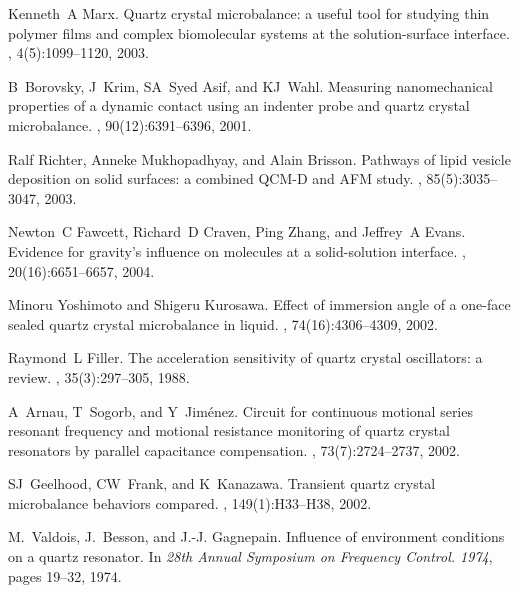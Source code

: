 \documentclass[floatfix,superscriptaddress,a4paper,twocolumn]{revtex4-1}
\begin{document}
\begin{thebibliography}{10}
  Kenneth~A Marx.
  \newblock Quartz crystal microbalance: a useful tool for studying thin polymer
  films and complex biomolecular systems at the solution-surface interface.
  , 4(5):1099--1120, 2003.

  B~Borovsky, J~Krim, SA~{Syed Asif}, and KJ~Wahl.
  \newblock Measuring nanomechanical properties of a dynamic contact using an
  indenter probe and quartz crystal microbalance.
  , 90(12):6391--6396, 2001.

  Ralf Richter, Anneke Mukhopadhyay, and Alain Brisson.
  \newblock Pathways of lipid vesicle deposition on solid surfaces: a combined
    {QCM-D} and {AFM} study.
  , 85(5):3035--3047, 2003.

  Newton~C Fawcett, Richard~D Craven, Ping Zhang, and Jeffrey~A Evans.
  \newblock Evidence for gravity's influence on molecules at a solid-solution
  interface.
  , 20(16):6651--6657, 2004.

  Minoru Yoshimoto and Shigeru Kurosawa.
  \newblock Effect of immersion angle of a one-face sealed quartz crystal
  microbalance in liquid.
  , 74(16):4306--4309, 2002.

  Raymond~L Filler.
  \newblock The acceleration sensitivity of quartz crystal oscillators: a review.
  , 35(3):297--305, 1988.

  A~Arnau, T~Sogorb, and Y~Jim{\'e}nez.
  \newblock Circuit for continuous motional series resonant frequency and
  motional resistance monitoring of quartz crystal resonators by parallel
  capacitance compensation.
  , 73(7):2724--2737, 2002.

  SJ~Geelhood, CW~Frank, and K~Kanazawa.
  \newblock Transient quartz crystal microbalance behaviors compared.
  , 149(1):H33--H38, 2002.

  M.~Valdois, J.~Besson, and J.-J. Gagnepain.
  \newblock Influence of environment conditions on a quartz resonator.
  \newblock In {\em 28th Annual Symposium on Frequency Control. 1974}, pages
  19--32, 1974.


\end{thebibliography}
\end{document}

